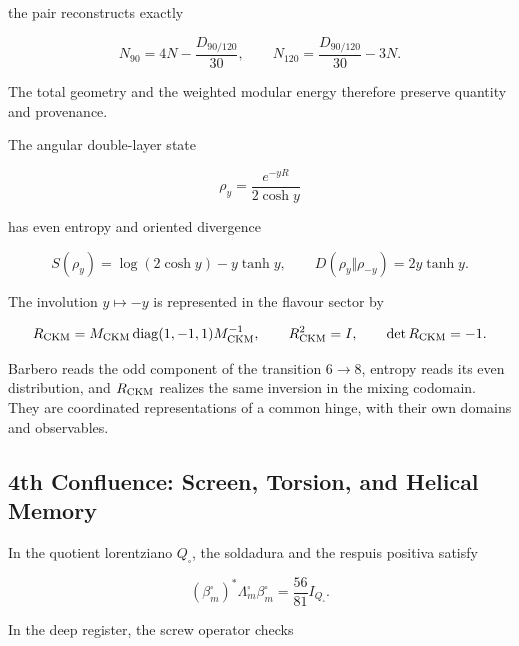 the pair reconstructs exactly

\begin{equation}
 N_{90}=4N-\frac{D_{90/120}}{30},
 \qquad
 N_{120}=\frac{D_{90/120}}{30}-3N.
 \label{rm:eq:confluence-sector-reconstruction}
\end{equation}

The total geometry and the weighted modular energy therefore preserve
quantity and provenance.

The angular double-layer state

\begin{equation}
 \rho_y=\frac{e^{-yR}}{2\cosh y}
 \label{rm:eq:confluence-rhoy}
\end{equation}

has even entropy and oriented divergence

\begin{equation}
 S(\rho_y)=\log(2\cosh y)-y\tanh y,
 \qquad
 D(\rho_y\Vert\rho_{-y})=2y\tanh y.
 \label{rm:eq:confluence-info-orientation}
\end{equation}

The involution \(y\mapsto-y\) is represented in the flavour sector by

\begin{equation}
 R_{\rm CKM}
 =M_{\rm CKM}\operatorname{diag}(1,-1,1)M_{\rm CKM}^{-1},
 \qquad
 R_{\rm CKM}^2=I,
 \qquad
 \det R_{\rm CKM}=-1.
 \label{rm:eq:confluence-rckm}
\end{equation}

Barbero reads the odd component of the transition \(6\to8\), entropy
reads its even distribution, and \(R_{\rm CKM}\) realizes the same inversion in the
mixing codomain.  They are coordinated representations of a common hinge,
with their own domains and observables.

\subsection{4th Confluence: Screen, Torsion, and Helical Memory}

In the quotient lorentziano \(Q_{\square}\), the soldadura and the respuis
positiva satisfy

\begin{equation}
 \boxed{
 (\beta_m^{\square})^*\Lambda_m^{\square}\beta_m^{\square}
 =\frac{56}{81}I_{Q_{\square}}.}
 \label{rm:eq:confluence-screen-energy}
\end{equation}

In the deep register, the screw operator checks


